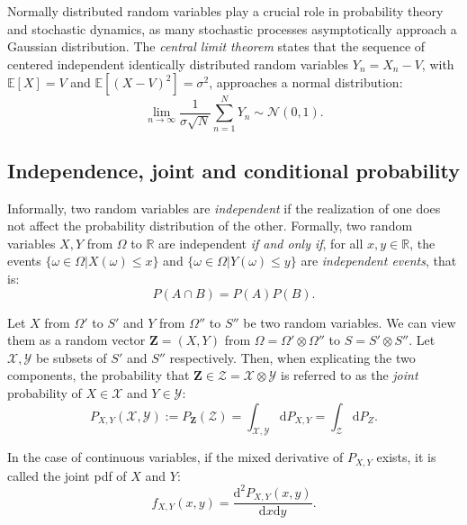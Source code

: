 \documentclass[a4paper,12pt]{book}
\begin{document}
Normally distributed random variables play a crucial role in probability theory and stochastic dynamics, as many stochastic processes asymptotically approach a Gaussian distribution. 
The \textit{central limit theorem} states that the sequence of centered independent identically distributed random variables $Y_n = X_n - V$, with $\mathbb{E}[X] = V$ and $\mathbb{E}[(X-V)^2] = \sigma^2$, approaches a normal distribution:
\begin{equation}
    \lim_{n \to\infty} \frac{1}{\sigma \sqrt{N}} \sum_{n=1}^N Y_n \sim \mathcal{N}(0,1).
\end{equation}

\subsection{Independence, joint and conditional probability}

Informally, two random variables are \textit{independent} if the realization of one does not affect the probability distribution of the other. Formally, two random variables $X,Y$ from $\Omega$ to $\mathbb{R}$ are independent\textit{ if and only if}, for all $x,y \in \mathbb{R}$, the events $\{\omega \in \Omega | X(\omega) \leq x\}$ and $\{\omega \in \Omega|Y(\omega) \leq y\}$ are \textit{independent events}, that is:
\begin{equation}
   P(A\cap B) = P(A)P(B). 
\end{equation}

Let $X$ from $\Omega'$ to $S'$  and $Y$ from $\Omega''$ to $S''$ be two random variables. We can view them as a random vector $\bm{Z} = (X,Y)$ from $\Omega = \Omega' \otimes \Omega''$ to $S = S' \otimes S''$. Let $\mathcal{X},\mathcal{Y}$ be subsets of $S'$ and $S''$ respectively. Then, when explicating the two components, the probability that $\bm{Z} \in \mathcal{Z} = \mathcal{X}\otimes\mathcal{Y}$ is referred to as the \textit{joint} probability of $X\in\mathcal{X}$ and $Y\in\mathcal{Y}$:
\begin{equation}
     P_{X,Y}(\mathcal{X},\mathcal{Y}) := P_{\bm{Z}}(\mathcal{Z}) = \int_{\mathcal{X},\mathcal{Y}} \mathrm{d} P_{X,Y} = \int_{\mathcal{Z}} \mathrm{d} P_{Z}. 
\end{equation}



In the case of continuous variables, if the mixed derivative of $P_{X,Y}$ exists, it is called the joint \acrshort{pdf} of $X$ and $Y$:
\begin{equation}
    f_{X,Y}(x,y) = \frac{\mathrm{d}^2P_{X,Y}(x,y)}{\mathrm{d}x\mathrm{d}y}.
\end{equation}
\end{document}

